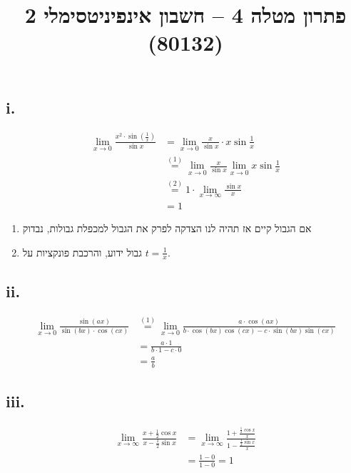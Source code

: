 
\usepackage{tikz}
\DeclareMathOperator\arcsinh{arcsinh}
\title{פתרון מטלה 4 – חשבון אינפיניטסימלי 2 (80132)}


\maketitle
\maketitleprint{}

\Question{}
\subsection{i.}
\begin{align*}
	\lim_{x \to 0} \frac{x^2 \cdot \sin(\displaystyle\frac{1}{x})}{\sin x}
	& = \lim_{x \to 0} \frac{x}{\sin x} \cdot x \sin \frac{1}{x} \\
	& \overset{(1)}{=} \lim_{x \to 0} \frac{x}{\sin x} \lim_{x \to 0}  x \sin \frac{1}{x} \\
	& \overset{(2)}{=} 1 \cdot \lim_{x \to \infty}  \frac{\sin x}{x} \\
	& = 1
\end{align*}
\begin{enumerate}
	\item אם הגבול קיים אז תהיה לנו הצדקה לפרק את הגבול למכפלת גבולות, נבדוק
	\item גבול ידוע, והרכבת פונקציות על $t = \frac{1}{x}$.
\end{enumerate}

\subsection{ii.}
\begin{align*}
	\lim_{x \to 0} \frac{\sin(ax)}{\sin(bx) \cdot \cos(cx)}
	& \overset{(1)}{=} \lim_{x \to 0} \frac{a \cdot \cos(ax)}{b \cdot \cos(bx) \cos(cx) - c \cdot \sin(bx) \sin(cx)} \\
	& = \frac{a \cdot 1}{b \cdot 1 - c \cdot 0} \\
	& = \frac{a}{b}
\end{align*}

\subsection{iii.}
\begin{align*}
	\lim_{x \to \infty} \frac{x + \frac{1}{2} \cos x}{x - \frac{1}{2} \sin x}
	& = \lim_{x \to \infty} \frac{1 + \frac{\frac{1}{2} \cos x}{x}}{1 - \frac{\frac{1}{2} \sin x}{x}} \\
	& = \frac{1 - 0}{1 - 0} = 1
\end{align*}

